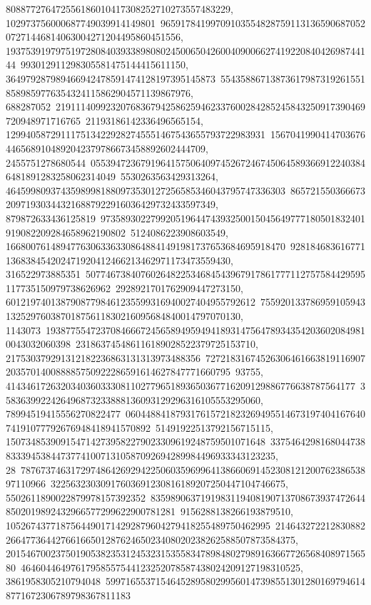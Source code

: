 {{{808877276472556186010417308252710273557483229, 102973756000687749039914149801\
9659178419970910355482875911313659068705207271446814063004271204495860451556, 
   19375391979751972808403933898080245006504260040900662741922084042698744144\
993012911298305581475144415611150, 364979287989466942478591474128197395145873\
554358867138736179873192615518589859776354324115862904571139867976, 688287052\
21911140992320768367942586259462337600284285245843250917390469720948971716765\
21193186142336496565154, 1299405872911175134229282745551467543655793722983931\
15670419904147036764465689104892042379786673458892602444709, 2455751278680544\
05539472367919641575064097452672467450645893669122403846481891283258062314049\
5530263563429313264, 46459980937435989981880973530127256585346043795747336303\
865721550366673209719303443216887922916036429732433597349, 879872633436125819\
97358930227992051964474393250015045649777180501832401919082209284658962190802\
5124086223908603549, 16680076148947763063363308648841491981737653684695918470\
928184683616771136838454202471920412466213462971173473559430, 316522973885351\
50774673840760264822534684543967917861777112757584429595117735150979738626962\
2928921701762909447273150, 60121974013879087798461235599316940027404955792612\
75592013378695910594313252976038701875611830216095684840014797070130, 1143073\
19387755472370846667245658949594941893147564789343542036020849810043032060398\
231863745486116189028522379725153710, 217530379291312182236863131313973488356\
72721831674526306461663819116907203570140088885750922286591614627847771660795\
93755, 4143461726320340360333081102779651893650367716209129886776638787564177\
3583639922426496873233888136093129296316105553295060, 78994519415556270822477\
06044884187931761572182326949551467319740416764074191077792676948418941570892\
51491922513792156715115, 1507348539091547142739582279023309619248759501071648\
3375464298168044738833394538447377410071310587092694289984496933343123235, 28\
78767374631729748642692942250603596996413866069145230812120076238653897110966\
32256323030917603691230816189207250447104746675, 5502611890022879978157392352\
83598906371919831194081907137086739374726448502019892432966577299622900781281\
9156288138266193879510, 10526743771875644901714292879604279418255489750462995\
2146432722128308822664773644276616650128762465023408020238262588507873584375, 
   20154670023750190538235312453231535583478984802798916366772656840897156580\
46460446497617958557544123252078587438024209127198310525, 3861958305210794048\
59971655371546452895802995601473985513012801697946148771672306789798367811183\
}}}
